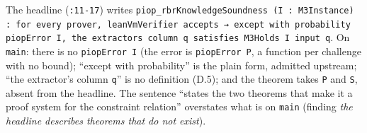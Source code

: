 The headline (\texttt{:11-{}17}) writes \texttt{p\allowbreak{}i\allowbreak{}o\allowbreak{}p\allowbreak{}\_\allowbreak{}r\allowbreak{}b\allowbreak{}r\allowbreak{}K\allowbreak{}n\allowbreak{}o\allowbreak{}w\allowbreak{}l\allowbreak{}e\allowbreak{}d\allowbreak{}g\allowbreak{}e\allowbreak{}S\allowbreak{}o\allowbreak{}u\allowbreak{}n\allowbreak{}d\allowbreak{}n\allowbreak{}e\allowbreak{}s\allowbreak{}s\allowbreak{} (\allowbreak{}I\allowbreak{} :\allowbreak{} M\allowbreak{}3\allowbreak{}I\allowbreak{}n\allowbreak{}s\allowbreak{}t\allowbreak{}a\allowbreak{}n\allowbreak{}c\allowbreak{}e\allowbreak{})\allowbreak{} :\allowbreak{} f\allowbreak{}o\allowbreak{}r\allowbreak{} e\allowbreak{}v\allowbreak{}e\allowbreak{}r\allowbreak{}y\allowbreak{} p\allowbreak{}r\allowbreak{}o\allowbreak{}v\allowbreak{}e\allowbreak{}r\allowbreak{},\allowbreak{} l\allowbreak{}e\allowbreak{}a\allowbreak{}n\allowbreak{}V\allowbreak{}m\allowbreak{}V\allowbreak{}e\allowbreak{}r\allowbreak{}i\allowbreak{}f\allowbreak{}i\allowbreak{}e\allowbreak{}r\allowbreak{} a\allowbreak{}c\allowbreak{}c\allowbreak{}e\allowbreak{}p\allowbreak{}t\allowbreak{}s\allowbreak{} →\allowbreak{} e\allowbreak{}x\allowbreak{}c\allowbreak{}e\allowbreak{}p\allowbreak{}t\allowbreak{} w\allowbreak{}i\allowbreak{}t\allowbreak{}h\allowbreak{} p\allowbreak{}r\allowbreak{}o\allowbreak{}b\allowbreak{}a\allowbreak{}b\allowbreak{}i\allowbreak{}l\allowbreak{}i\allowbreak{}t\allowbreak{}y\allowbreak{} p\allowbreak{}i\allowbreak{}o\allowbreak{}p\allowbreak{}E\allowbreak{}r\allowbreak{}r\allowbreak{}o\allowbreak{}r\allowbreak{} I\allowbreak{},\allowbreak{} t\allowbreak{}h\allowbreak{}e\allowbreak{} e\allowbreak{}x\allowbreak{}t\allowbreak{}r\allowbreak{}a\allowbreak{}c\allowbreak{}t\allowbreak{}o\allowbreak{}r\allowbreak{}\textquotesingle{}\allowbreak{}s\allowbreak{} c\allowbreak{}o\allowbreak{}l\allowbreak{}u\allowbreak{}m\allowbreak{}n\allowbreak{} q\allowbreak{} s\allowbreak{}a\allowbreak{}t\allowbreak{}i\allowbreak{}s\allowbreak{}f\allowbreak{}i\allowbreak{}e\allowbreak{}s\allowbreak{} M\allowbreak{}3\allowbreak{}H\allowbreak{}o\allowbreak{}l\allowbreak{}d\allowbreak{}s\allowbreak{} I\allowbreak{} i\allowbreak{}n\allowbreak{}p\allowbreak{}u\allowbreak{}t\allowbreak{} q}. On \texttt{main}: there is no \texttt{piopError I} (the error is \texttt{piopError P}, a function per challenge with no bound); \enquote{except with probability} is the plain form, admitted upstream; \enquote{the extractor's column \texttt{q}} is no definition (D.5); and the theorem takes \texttt{P} and \texttt{S}, absent from the headline. The sentence \enquote{states the two theorems that make it a proof system for the constraint relation} overstates what is on \texttt{main} (finding \emph{the headline describes theorems that do not exist}).

